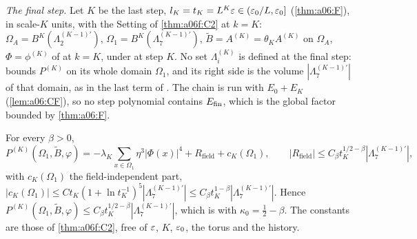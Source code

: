 
\emph{The final step.} Let $K$ be the last step, $l_K=t_K=L^K\varepsilon\in(\varepsilon_0/L,\varepsilon_0]$ (\cref{thm:a06:F}), in scale-$K$ units, with the Setting of \cref{thm:a06f:C2} at $k=K$: $\Omega_A=B^K(\Lambda^{(K-1)'}_2)$, $\Omega_1=B^K(\Lambda^{(K-1)'}_7)$, $\tilde B=A^{(K)}=\theta_KA^{(K)}$ on $\Omega_A$, $\Phi=\phi^{(K)}$ of \cite[(2.56)]{Ba2} at $k=K$, under \cite[(2.55)]{Ba2} at step $K$. No set $\Lambda^{(K)}_i$ is defined at the final step: \cite[(2.116)]{Ba2} bounds $P^{(K)}$ on its whole domain $\Omega_1$, and its right side is the volume $|\Lambda^{(K-1)'}_7|$ of that domain, as in the last term of \cite[(2.117)]{Ba2}. The chain is run with $E_0+E_K$ (\cref{lem:a06:CF}), so no step polynomial contains $E_{\mathrm{fin}}$, which is the global factor bounded by \cref{thm:a06:F}.

\begin{proposition}\label{prop:a06g:FS}
For every $\beta>0$,
\[
P^{(K)}(\Omega_1,\tilde B,\varphi)=-\lambda_K\sum_{x\in\Omega_1}\eta^3|\Phi(x)|^4+R_{\mathrm{field}}+c_K(\Omega_1),\qquad|R_{\mathrm{field}}|\le C_\beta t_K^{1/2-\beta}|\Lambda^{(K-1)'}_7|,
\]
with $c_K(\Omega_1)$ the field-independent part, $|c_K(\Omega_1)|\le Ct_K(1+\ln t_K^{-1})^5|\Lambda^{(K-1)'}_7|\le C_\beta t_K^{1-\beta}|\Lambda^{(K-1)'}_7|$. Hence $P^{(K)}(\Omega_1,\tilde B,\varphi)\le C_\beta t_K^{1/2-\beta}|\Lambda^{(K-1)'}_7|$, which is \cite[(2.116)]{Ba2} with $\kappa_0=\frac12-\beta$. The constants are those of \cref{thm:a06f:C2}, free of $\varepsilon$, $K$, $\varepsilon_0$, the torus and the history.
\end{proposition}

